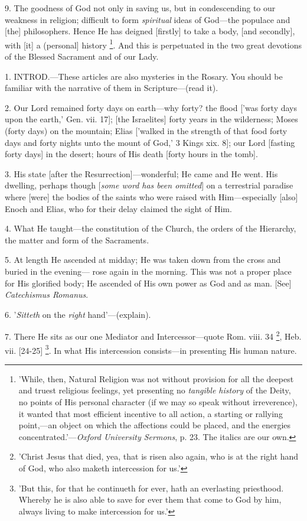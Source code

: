 9. The goodness of God not only in saving us, but
in condescending to our weakness in religion; difficult to form \emph{spiritual}
ideas of God—the populace and [the] philosophers. Hence He has
deigned [firstly] to take a body, [and secondly], with [it] a
(personal] history \footnote{'While, then, Natural
Religion was not without provision for all the deepest and truest
religious feelings, yet presenting no \emph{tangible history} of the
Deity, no points of His personal character (if we may so speak without
irreverence), it wanted that most efficient incentive to all action, a
starting or rallying point,—an object on which the affections could
be placed, and the energies concentrated.'—\emph{Oxford University
Sermons}, p. 23. The italics are our own.}.
And this is perpetuated in the two great devotions of the
Blessed Sacrament and of our Lady.


1. INTROD.—These
articles are also mysteries in the Rosary. You should be familiar with
the narrative of them in Scripture—(read it).

2. Our Lord remained forty days on earth—why
forty? the flood ['was forty days upon the earth,' Gen. vii. 17]; [the
Israelites] forty years in the wilderness; Moses (forty days) on the
mountain; Elias ['walked in the strength of that food forty days and
forty nights unto the mount of God,' 3 Kings xix. 8]; our Lord
[fasting forty days] in the desert; hours of His death [forty hours in
the tomb].

3. His state [after the
Resurrection]—wonderful; He came and He went. His dwelling, perhaps
though [\emph{some word has been omitted}] on a terrestrial paradise
where [were] the bodies of the saints who were raised with
Him—especially [also] Enoch and Elias, who for their delay claimed
the sight of Him.

4. What He taught—the constitution of the
Church, the orders of the Hierarchy, the matter and form of the
Sacraments.

5. At length He ascended at midday; He was taken
down from the cross and buried in the evening— rose again in
the morning. This was not a proper place for His glorified body; He
ascended of His own power as God and as man. [See] \emph{Catechismus
Romanus}.

6. '\emph{Sitteth} on the \emph{right}
hand'—(explain).

7. There He sits as our one Mediator and
Intercessor—quote Rom. viii. 34 \footnote{'Christ Jesus that died,
yea, that is risen also again, who is at the right hand of God, who
also maketh intercession for us.'}, Heb. vii. [24-25] \footnote{'But this, for that he
continueth for ever, hath an everlasting priesthood. Whereby he is
also able to save for ever them that come to God by him, always living
to make intercession for us.'}.
In what His intercession consists—in presenting His human nature.

